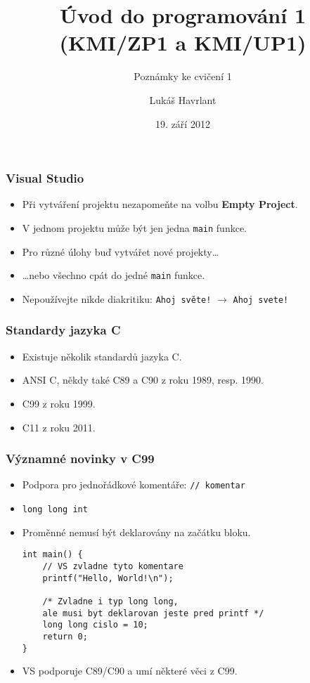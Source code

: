 \documentclass{beamer}
\title{Úvod do programování 1 (KMI/ZP1 a KMI/UP1)}
\subtitle{Poznámky ke cvičení 1}
\author{Lukáš Havrlant}
\date{19. září 2012}
\institute{Univerzita Palackého}
\newenvironment{itemizex}%
  {\large \begin{itemize}%
    \setlength{\itemsep}{8pt}%
    \setlength{\parskip}{8pt}}%
  {\end{itemize}}
\begin{document}
\begin{frame}[t,plain]
\titlepage
\end{frame}

\begin{frame}[t,fragile]\frametitle{Visual Studio} 
  \begin{itemizex}
    \item Při vytváření projektu nezapomeňte na volbu \textbf{Empty Project}.
    \item V jednom projektu může být jen jedna \texttt{main} funkce. 
    \item Pro různé úlohy buď vytvářet nové projekty\dots
    \item \dots nebo všechno cpát do jedné \texttt{main} funkce.
    \item Nepoužívejte nikde diakritiku: \texttt{Ahoj světe!} $\longrightarrow$ \texttt{Ahoj svete!}
  \end{itemizex}
\end{frame}



\begin{frame}[t,fragile]\frametitle{Standardy jazyka C} 
  \begin{itemizex}
    \item Existuje několik standardů jazyka C. 
    \item ANSI C, někdy také C89 a C90 z roku 1989, resp. 1990.
    \item C99 z roku 1999.
    \item C11 z roku 2011. 
  \end{itemizex}
\end{frame}


\begin{frame}[t,fragile]\frametitle{Významné novinky v C99} 
  \begin{itemize}
    \item Podpora pro jednořádkové komentáře: \texttt{// komentar}
    \item \texttt{long long int}
    \item Proměnné nemusí být deklarovány na začátku bloku.
    \begin{verbatim} 
int main() {
    // VS zvladne tyto komentare
    printf("Hello, World!\n");

    /* Zvladne i typ long long, 
    ale musi byt deklarovan jeste pred printf */
    long long cislo = 10; 
    return 0;
}
    \end{verbatim}
    \item VS podporuje C89/C90 a umí některé věci z C99.
  \end{itemize}
\end{frame}
\end{document}

